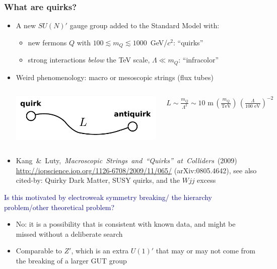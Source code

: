 \documentclass[compress]{beamer}
\begin{document}
\begin{frame}
\frametitle{What are quirks?}

\begin{itemize}
\item A new $SU(N)'$ gauge group added to the Standard Model with:
\begin{itemize}
\item new fermons $Q$ with $100 \lesssim m_Q \lesssim 1000$~GeV/$c^2$: ``quirks''
\item strong interactions {\it below} the TeV scale, $\Lambda \ll m_Q$: ``infracolor''
\end{itemize}

\item Weird phenomenology: macro or mesoscopic strings (flux tubes)

\begin{columns}

\includegraphics[width=\linewidth]{quirk_string.pdf}

$\displaystyle L \sim \frac{m_Q}{\Lambda^2} \sim \mbox{10 m} \, \left(\frac{m_Q}{\mbox{TeV}}\right) \, \left(\frac{\Lambda}{\mbox{100 eV}}\right)^{-2}$
\end{columns}

\item \mbox{Kang \& Luty, {\it Macroscopic Strings and ``Quirks'' at Colliders} (2009)\hspace{-1 cm}} \\ \url{http://iopscience.iop.org/1126-6708/2009/11/065/} (arXiv:0805.4642), {\tiny see also cited-by: Quirky Dark Matter, SUSY quirks, and the $Wjj$ excess}

\end{itemize}

\vfill
\hspace{-0.83 cm} \textcolor{darkblue}{\Large Is this motivated by electroweak symmetry breaking/ the hierarchy problem/other theoretical problem?}

\begin{itemize}
\item No: it is a possibility that is consistent with known data, and might be missed without a deliberate search

\item Comparable to $Z'$, which is an extra $U(1)'$ that may or may not come from the breaking of a larger GUT group
\end{itemize}
\end{frame}
\end{document}
